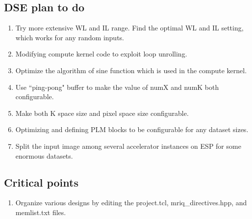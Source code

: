 \documentclass{sig-alternate}
\begin{document}
\subsection{DSE plan to do}
\begin{enumerate}
\setlength\itemsep{-0.15em}
\item Try more extensive WL and IL range. Find the optimal WL and IL setting, which works for any random inputs.
\item Modifying compute kernel code to exploit loop unrolling.
\item Optimize the algorithm of sine function which is used in the compute kernel.
\item Use ``ping-pong" buffer to make the value of numX and numK both configurable.
\item Make both K space size and pixel space size configurable.
\item Optimizing and defining PLM blocks to be configurable for any dataset sizes.
\item Split the input image among several accelerator instances on ESP for some enormous datasets.
\end{enumerate}

\subsection{Critical points}

\begin{enumerate}
\setlength\itemsep{-0.15em}
\item Organize various designs by editing the project.tcl, mriq\_directives.hpp, and memlist.txt files.
\end{enumerate}

{\small
\balance
%


}






\end{document}
